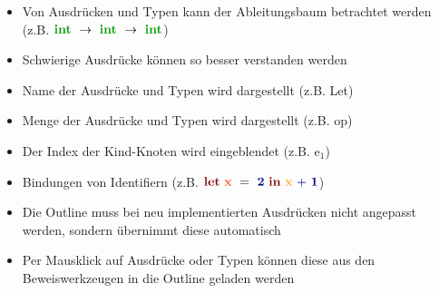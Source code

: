 {
  \begin{itemize}
    \item Von Ausdrücken und Typen kann der Ableitungsbaum betrachtet werden
          (z.B. $\TypeArrowType{\TypeIntegerType}{\TypeArrowType{\TypeIntegerType}{\TypeIntegerType}}$)
    \item Schwierige Ausdrücke können so besser verstanden werden
    \item Name der Ausdrücke und Typen wird dargestellt (z.B. Let)
    \item Menge der Ausdrücke und Typen wird dargestellt (z.B. op)
    \item Der Index der Kind-Knoten wird eingeblendet (z.B. e$_1$)
    \item Bindungen von Identifiern (z.B. $\ExprLet{\ExprIdentifierBinding{x}}{}{\ExprConstant{2}}
          {\ExprInfixOperation{\ExprBinaryOperator{+}}{\ExprIdentifierBound{x}}{\ExprConstant{1}}}$)
    \item Die Outline muss bei neu implementierten Ausdrücken nicht angepasst
          werden, sondern übernimmt diese automatisch
    \item Per Mausklick auf Ausdrücke oder Typen können diese aus den Beweiswerkzeugen
          in die Outline geladen werden
  \end{itemize}
}


